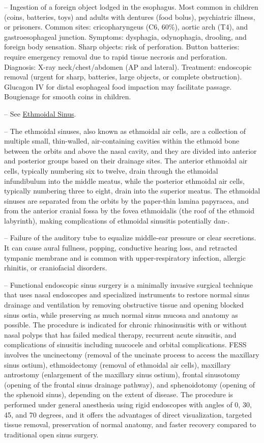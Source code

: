 -- Ingestion of a foreign object lodged in the esophagus. Most common in children (coins, batteries, toys) and adults with dentures (food bolus), psychiatric illness, or prisoners. Common sites: cricopharyngeus (C6, 60\%), aortic arch (T4), and gastroesophageal junction. Symptoms: dysphagia, odynophagia, drooling, and foreign body sensation. Sharp objects: risk of perforation. Button batteries: require emergency removal due to rapid tissue necrosis and perforation. Diagnosis: X-ray neck/chest/abdomen (AP and lateral). Treatment: endoscopic removal (urgent for sharp, batteries, large objects, or complete obstruction). Glucagon IV for distal esophageal food impaction may facilitate passage. Bougienage for smooth coins in children.

-- See \hyperlink{Ethmoidal Sinus}{Ethmoidal Sinus}.

-- The ethmoidal sinuses, also known as ethmoidal air cells, are a collection of multiple small, thin-walled, air-containing cavities within the ethmoid bone between the orbits and above the nasal cavity, and they are divided into anterior and posterior groups based on their drainage sites. The anterior ethmoidal air cells, typically numbering six to twelve, drain through the ethmoidal infundibulum into the middle meatus, while the posterior ethmoidal air cells, typically numbering three to eight, drain into the superior meatus. The ethmoidal sinuses are separated from the orbits by the paper-thin lamina papyracea, and from the anterior cranial fossa by the fovea ethmoidalis (the roof of the ethmoid labyrinth), making complications of ethmoidal sinusitis potentially dan-.

-- Failure of the auditory tube to equalize middle-ear pressure or clear secretions. It can cause aural fullness, popping, conductive hearing loss, and retracted tympanic membrane and is common with upper-respiratory infection, allergic rhinitis, or craniofacial disorders.

-- Functional endoscopic sinus surgery is a minimally invasive surgical technique that uses nasal endoscopes and specialized instruments to restore normal sinus drainage and ventilation by removing obstructive tissue and opening blocked sinus ostia, while preserving as much normal sinus mucosa and anatomy as possible. The procedure is indicated for chronic rhinosinusitis with or without nasal polyps that has failed medical therapy, recurrent acute sinusitis, and complications of sinusitis including mucocele and orbital complications. FESS involves the uncinectomy (removal of the uncinate process to access the maxillary sinus ostium), ethmoidectomy (removal of ethmoidal air cells), maxillary antrostomy (enlargement of the maxillary sinus ostium), frontal sinusotomy (opening of the frontal sinus drainage pathway), and sphenoidotomy (opening of the sphenoid sinus), depending on the extent of disease. The procedure is performed under general anesthesia using rigid endoscopes with angles of 0, 30, 45, and 70 degrees, and it offers the advantages of direct visualization, targeted tissue removal, preservation of normal anatomy, and faster recovery compared to traditional open sinus surgery.

